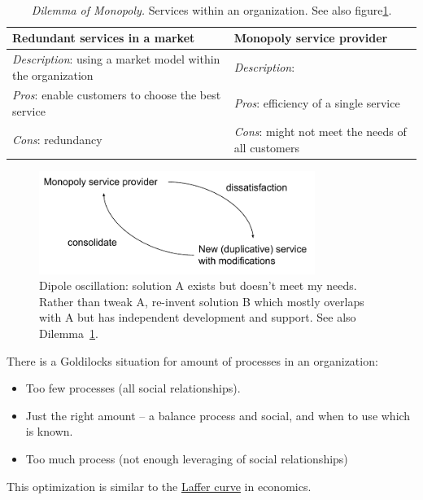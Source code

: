 \ \\

\begin{center}
\begin{table}[H] %
\begin{tabular}{ | m{\dilemmatablewidth}| m{\dilemmatablewidth} | } 
  \hline
  \textbf{Redundant services in a market} &
  \textbf{Monopoly service provider} \\
  \hline
  \textit{Description}: using a market model within the organization &
  \textit{Description}:  \\  
  \hline
  \textit{Pros}: enable customers to choose the best service &
  \textit{Pros}: efficiency of a single service \\
  \hline
  \textit{Cons}: redundancy & 
  \textit{Cons}: might not meet the needs of all customers \\
  \hline
\end{tabular}
\caption{\textit{Dilemma of Monopoly.}
Services within an organization. See also figure\ref{fig:market-vs-monopoly}.
}
\label{table:market-vs-monopoly}
\end{table}
\end{center}


\begin{figure}[H] %
    \centering
    \includegraphics[width=0.8\textwidth]{images/dilemma_market_vs_monopoly.pdf}
    \caption{Dipole oscillation: solution A exists but doesn't meet my needs. Rather than tweak A, re-invent solution B which mostly overlaps with A but has independent development and support. See also Dilemma~\ref{table:market-vs-monopoly}.}
    \label{fig:market-vs-monopoly}
\end{figure}


There is a Goldilocks situation for amount of processes in an organization:
\begin{itemize}
    \item Too few processes (all social relationships).
    \item Just the right amount -- a balance process and social, and when to use which is known.
    \item Too much process (not enough leveraging of social relationships)
\end{itemize}
This optimization is similar to the \href{https://en.wikipedia.org/wiki/Laffer_curve}{Laffer curve} in economics.

